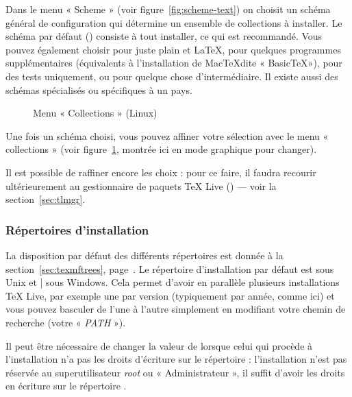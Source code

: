 \documentclass[german, english, french]{article}
\renewcommand{\TL}{\TeX{} Live\xspace}%
\newcommand\eng[1]{\foreignlanguage{english}{\emph{#1}}}
\begin{document}
Dans le menu « Scheme » (voir figure~\ref{fig:scheme-text}) on choisit un schéma
général de configuration qui détermine un ensemble de collections à installer.
Le schéma par défaut () consiste à tout installer, ce qui est
recommandé. Vous pouvez également choisir  pour juste plain et
\LaTeX{},  pour quelques programmes supplémentaires (équivalents
à l'installation de Mac\TeX dite « Basic\TeX »),  pour des
tests uniquement,  ou  pour quelque chose
d'intermédiaire. Il existe aussi des schémas spécialisés ou spécifiques à un
pays.

\begin{figure}[tb]
  \def\figdesc{Menu « Collections »}
  \centering \tlpng{stdcoll}{.7\linewidth}{\figdesc}
  \caption{Menu « Collections » (Linux)}\label{fig:collections-gui}
\end{figure}

Une fois un schéma choisi, vous pouvez affiner votre sélection avec le menu
« collections » (voir figure~\ref{fig:collections-gui}, montrée ici en mode
graphique pour changer).

Il est possible de raffiner encore les choix : pour ce faire, il faudra recourir
ultérieurement au gestionnaire de paquets TeX Live () --- voir la
section~\ref{sec:tlmgr}.

\subsubsection{Répertoires d'installation}
\label{sec:directories}

La disposition par défaut des différents répertoires est donnée à la
section~\ref{sec:texmftrees}, page~\pageref{sec:texmftrees}.  Le répertoire
d'installation par défaut est  sous Unix et
|%
sous Windows. Cela permet d'avoir en parallèle plusieurs installations \TL{},
par exemple une par version (typiquement par année, comme ici) et vous pouvez
basculer de l'une à l'autre simplement en modifiant votre chemin de recherche
(votre « \emph{PATH} »).

Il peut être nécessaire de changer la valeur de  lorsque celui
qui procède à l'installation n'a pas les droits d'écriture sur le répertoire
 : l'installation n'est pas réservée au superutilisateur
\eng{root} ou « Administrateur », il suffit d'avoir les droits en écriture sur
le répertoire .
\end{document}
